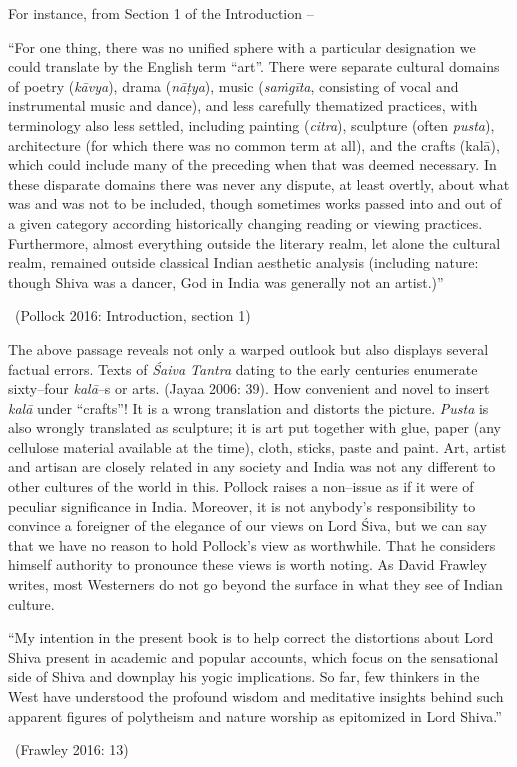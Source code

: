 For instance, from Section 1 of the Introduction –

\begin{myquote}
“For one thing, there was no unified sphere with a particular designation we could translate by the English term “art”. There were separate cultural domains of poetry (\textit{kāvya}), drama (\textit{nāṭya}), music (\textit{saṁgīta}, consisting of vocal and instrumental music and dance), and less carefully thematized practices, with terminology also less settled, including painting (\textit{citra}), sculpture (often \textit{pusta}), architecture (for which there was no common term at all), and the crafts (kalā), which could include many of the preceding when that was deemed necessary. In these disparate domains there was never any dispute, at least overtly, about what was and was not to be included, though sometimes works passed into and out of a given category according historically changing reading or viewing practices. Furthermore, almost everything outside the literary realm, let alone the cultural realm, remained outside classical Indian aesthetic analysis (including nature: though Shiva was a dancer, God in India was generally not an artist.)” 

~\hfill (Pollock 2016: Introduction, section 1)
\end{myquote}

The above passage reveals not only a warped outlook but also displays several factual errors. Texts of \textit{Śaiva Tantra} dating to the early centuries enumerate sixty–four \textit{kalā}–s or arts. (Jayaa 2006: 39). How convenient and novel to insert \textit{kalā} under “crafts”! It is a wrong translation and distorts the picture. \textit{Pusta} is also wrongly translated as sculpture; it is art put together with glue, paper (any cellulose material available at the time), cloth, sticks, paste and paint. Art, artist and artisan are closely related in any society and India was not any different to other cultures of the world in this. Pollock raises a non–issue as if it were of peculiar significance in India. Moreover, it is not anybody’s responsibility to convince a foreigner of the elegance of our views on Lord Śiva, but we can say that we have no reason to hold Pollock’s view as worthwhile. That he considers himself authority to pronounce these views is worth noting. As David Frawley writes, most Westerners do not go beyond the surface in what they see of Indian culture.

\begin{myquote}
“My intention in the present book is to help correct the distortions about Lord Shiva present in academic and popular accounts, which focus on the sensational side of Shiva and downplay his yogic implications. So far, few thinkers in the West have understood the profound wisdom and meditative insights behind such apparent figures of polytheism and nature worship as epitomized in Lord Shiva.” 

~\hfill (Frawley 2016: 13)
\end{myquote}

